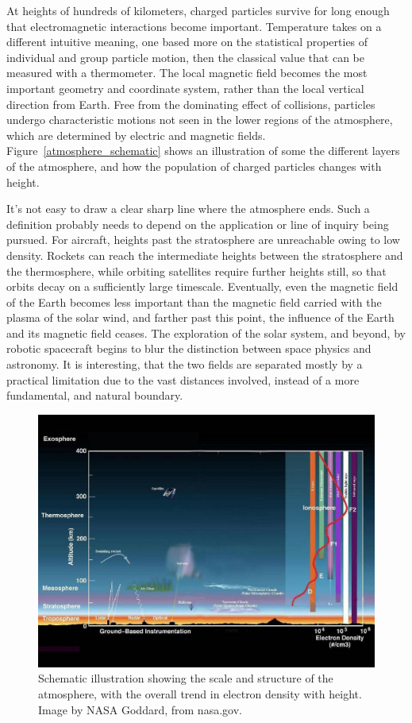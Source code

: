 At heights of hundreds of kilometers, charged particles survive for long enough that electromagnetic interactions become important. Temperature takes on a different intuitive meaning, one based more on the statistical properties of individual and group particle motion, then the classical value that can be measured with a thermometer. The local magnetic field becomes the most important geometry and coordinate system, rather than the local vertical direction from Earth. Free from the dominating effect of collisions, particles undergo characteristic motions not seen in the lower regions of the atmosphere, which are determined by electric and magnetic fields. Figure~\ref{atmosphere_schematic} shows an illustration of some the different layers of the atmosphere, and how the population of charged particles changes with height.

It's not easy to draw a clear sharp line where the atmosphere ends. Such a definition probably needs to depend on the application or line of inquiry being pursued. For aircraft, heights past the stratosphere are unreachable owing to low density. Rockets can reach the intermediate heights between the stratosphere and the thermosphere, while orbiting satellites require further heights still, so that orbits decay on a sufficiently large timescale. Eventually, even the magnetic field of the Earth becomes less important than the magnetic field carried with the plasma of the solar wind, and farther past this point, the influence of the Earth and its magnetic field ceases. The exploration of the solar system, and beyond, by robotic spacecraft begins to  blur the distinction between space physics and astronomy. It is interesting, that the two fields are separated mostly by a practical limitation due to the vast distances involved, instead of a more fundamental, and natural boundary.


\begin{figure}[p]
\label{}
\begin{centering}
\includegraphics[width=.9\textwidth]{figures/chapter_1/atmosphere_schematic/atmosphere_schematic}
\caption{Schematic illustration showing the scale and structure of the atmosphere, with the overall trend in electron density with height. Image by NASA Goddard, from nasa.gov.}
\end{centering}
\end{figure}
\newpage

